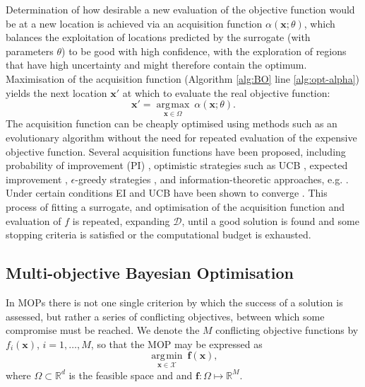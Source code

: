 \documentclass[conference]{IEEEtran}
\newcommand{\parameterspace}{\Omega}
\newcommand{\ndim}{d}
\newcommand{\nobj}{M}
\DeclareMathOperator*{\argmax}{\arg\!\max}
\DeclareMathOperator*{\argmin}{\arg\!\min}
\newcommand\ei{EI\xspace}
\newcommand\mX{\mathcal{X}}
\newcommand{\bx}{\mathbf{x}}
\begin{document}
Determination of how desirable a new evaluation of the objective function
would be at a new location is achieved via an acquisition function $\alpha(\mathbf{x};  \theta)$, which balances the exploitation of locations predicted by the surrogate (with parameters $\theta$) to be good with high confidence, with the exploration of regions that have high uncertainty and might therefore contain the optimum. Maximisation of the acquisition function (Algorithm \ref{alg:BO} line \ref{alg:opt-alpha}) yields the next location $\bx'$ at which to evaluate the real objective function: 
\begin{equation}\label{eqn: argmax_alpha}
   \bx' = \underset{\mathbf{x} \in \Omega}{\argmax}\:\alpha(\mathbf{x};  \theta).
\end{equation}
The acquisition function can be cheaply optimised using methods such as an evolutionary algorithm without the need for repeated evaluation of the expensive objective function. Several  acquisition functions have been proposed,
including probability of improvement (PI) \cite{kushner:ego},
optimistic strategies such as UCB \cite{srinivas:ucb:2010},
expected improvement \cite{jones1998efficient}, 
$\epsilon$-greedy strategies \cite{bull2011convergence, death2019greed},
and information-theoretic approaches, e.g. \cite{scott:kg:2011,  ru:fitbo:2018}.  
Under certain conditions \ei and UCB have been shown to converge \cite{bull2011convergence, srinivas:ucb:2010}. This process of fitting a surrogate, and optimisation of the acquisition function and evaluation of $f$ is repeated,  expanding $\mathcal{D}$,  until a good solution is found and some stopping criteria is satisfied or the computational budget is exhausted.

\subsection{Multi-objective Bayesian Optimisation}\label{section:background_MOPs}
In MOPs there is not one single criterion by which the success of a solution is assessed, but rather a series of conflicting objectives, between which some compromise must be reached. We denote the $\nobj$ conflicting objective functions by $f_i(\bx)$, $i = 1, \ldots, \nobj$, so that the MOP may be expressed 
as 
\begin{equation}\label{eqn: min_F}
\underset{\mathbf{x} \in \mX}{\argmin}\:\mathbf{f}(\mathbf{x}), 
\end{equation}
where $\parameterspace \subset \mathbb{R}^\ndim$ is the feasible space and and $\mathbf{f}: \Omega \mapsto \mathbb{R}^{\nobj}$.
\end{document}
